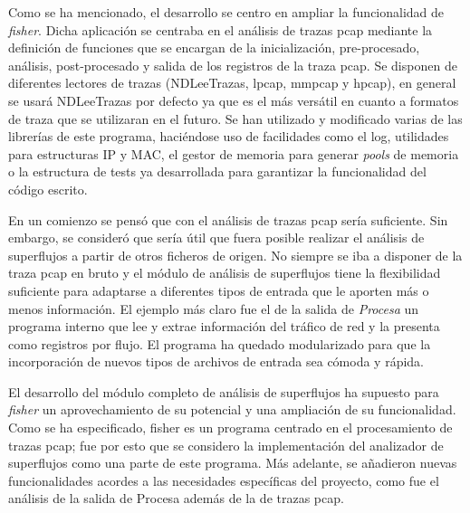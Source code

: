\documentclass[tfg,epsbased,lof,lot,loa,covers,final,copyright,overleaf]{tfgtfmthesisuam}
\begin{document}
Como se ha mencionado, el desarrollo se centro en ampliar la funcionalidad de \textit{fisher}. Dicha aplicación se centraba en el análisis de trazas \gls{pcap} mediante la definición de funciones que se encargan de la inicialización, pre-procesado, análisis, post-procesado y salida de los registros de la traza pcap. Se disponen de diferentes lectores de trazas (NDLeeTrazas, lpcap, mmpcap y hpcap), en general se usará NDLeeTrazas por defecto ya que es el más versátil en cuanto a formatos de traza que se utilizaran en el futuro. 
Se han utilizado y modificado varias de las librerías de este programa, haciéndose uso de facilidades como el log, utilidades para estructuras IP y MAC, el gestor de memoria para generar \textit{pools} de memoria o la estructura de tests ya desarrollada para garantizar la funcionalidad del código escrito.

En un comienzo se pensó que con el análisis de trazas pcap sería suficiente. Sin embargo, se consideró que sería útil que fuera posible realizar el análisis de superflujos a partir de otros ficheros de origen. No siempre se iba a disponer de la traza pcap en bruto y el módulo de análisis de superflujos tiene la flexibilidad suficiente para adaptarse a diferentes tipos de entrada que le aporten más o menos información. El ejemplo más claro fue el de la salida de \textit{Procesa} un programa interno que lee y extrae información del tráfico de red y la presenta como registros por flujo. El programa ha quedado modularizado para que la incorporación de nuevos tipos de archivos de entrada sea cómoda y rápida.

El desarrollo del módulo completo de análisis de superflujos ha supuesto para \textit{fisher} un aprovechamiento de su potencial y una ampliación de su funcionalidad. Como se ha especificado, fisher es un programa centrado en el procesamiento de trazas pcap; fue por esto que se considero la implementación del analizador de superflujos como una parte de este programa. Más adelante, se añadieron nuevas funcionalidades acordes a las necesidades específicas del proyecto, como fue el análisis de la salida de Procesa además de la de trazas pcap.
\end{document}
